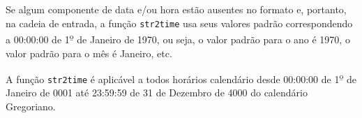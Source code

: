 \documentclass[11pt, brazil]{report}
\begin{document}
%
%
%
%
%
%
%


Se algum componente de data e/ou hora estão ausentes no formato e,
portanto, na cadeia de entrada, a função {\tt str2time} usa seus valores
padrão correspondendo a 00:00:00 de 1{\textsuperscript{\b{o}}}
de Janeiro de 1970, ou seja, o valor padrão para o ano é 1970, o valor
padrão para o mês é Janeiro, etc.

A função {\tt str2time} é aplicável a todos horários calendário desde
00:00:00 de 1{\textsuperscript{\b{o}}} de Janeiro de 0001 até 23:59:59
de 31 de Dezembro de 4000 do calendário Gregoriano.
\end{document}
